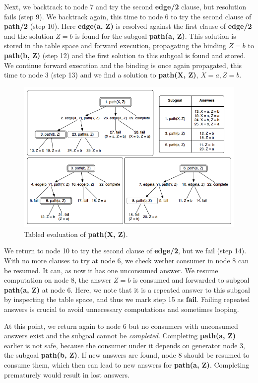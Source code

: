 Next, we backtrack to node 7 and try the second \textbf{edge/2} clause, but resolution fails (step 9). We backtrack again, this time to
node 6 to try the second clause of \textbf{path/2} (step 10). Here \textbf{edge(a, Z)} is resolved against the first clause of \textbf{edge/2}
and the solution $Z = b$ is found for the subgoal \textbf{path(a, Z)}. This solution is stored in the table space and forward
execution, propagating the binding $Z = b$ to \textbf{path(b, Z)} (step 12) and the first solution to this subgoal is found and stored.
We continue forward execution and the binding is once again propagated, this time to node 3 (step 13) and we find a solution to
\textbf{path(X, Z)}, $X = a, Z = b$.

\begin{figure}[ht]
  \centering
    \includegraphics[scale=0.6]{tabling_path.png}
  \caption{Tabled evaluation of \textbf{path(X, Z)}.}
  \label{fig:tabling_path}
\end{figure}

We return to node 10 to try the second clause of \textbf{edge/2}, but we fail (step 14). With no more clauses to try at node 6,
we check wether consumer in node 8 can be resumed. It can, as now it has one unconsumed answer. We resume computation on node 8,
the answer $Z = b$ is consumed and forwarded to subgoal \textbf{path(a, Z)} at node 6. Here, we note that it is a repeated answer
to this subgoal by inspecting the table space, and thus we mark step 15 as \textbf{fail}. Failing repeated answers is crucial
to avoid unnecessary computations and sometimes looping.

At this point, we return again to node 6 but no consumers with unconsumed answers exist and the subgoal cannot be \textit{completed}.
Completing \textbf{path(a, Z)} earlier is not safe, because the consumer under it depends on generator node 3, the subgoal \textbf{path(b, Z)}.
If new answers are found, node 8 should be resumed to consume them, which then can lead to new answers for \textbf{path(a, Z)}.
Completing prematurely would result in lost answers.

